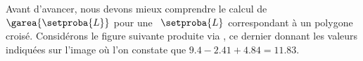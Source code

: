 %
%    
%
%
%
%
%    
%	
%	
%
%
%
%
%
\newpage

Avant d'avancer, nous devons mieux comprendre le calcul de $\garea{\setproba{L}}$ pour une \nline\ $\setproba{L}$ correspondant à un polygone croisé.
Considérons le figure suivante produite via \geogebra, ce dernier donnant les valeurs indiquées sur l'image où l'on constate que $\num{9.4} - \num{2.41} + \num{4.84} = \num{11.83}$.



